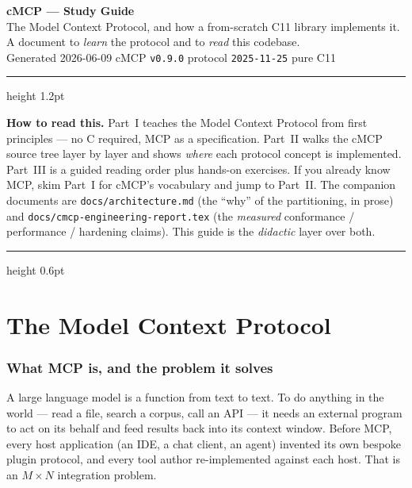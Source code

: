 \documentclass[10pt]{article}
\newcommand{\code}[1]{\texttt{\small #1}}
\begin{document}
\begin{center}
  {\LARGE\bfseries cMCP --- Study Guide}\\[4pt]
  {\normalsize The Model Context Protocol, and how a from-scratch C11 library implements it.\\
   A document to \emph{learn} the protocol and to \emph{read} this codebase.}\\[6pt]
  {\small\color{rulegrey} Generated 2026-06-09 \quad\textbullet\quad
   cMCP \code{v0.9.0} \quad\textbullet\quad protocol \code{2025-11-25} \quad\textbullet\quad pure C11}
\end{center}
\vspace{-2pt}
{\color{secblue}\hrule height 1.2pt}
\vspace{6pt}

{\small\textbf{How to read this.} Part~I teaches the Model Context Protocol from
first principles --- no C required, MCP as a specification. Part~II walks the
cMCP source tree layer by layer and shows \emph{where} each protocol concept is
implemented. Part~III is a guided reading order plus hands-on exercises. If you
already know MCP, skim Part~I for cMCP's vocabulary and jump to Part~II. The
companion documents are \code{docs/architecture.md} (the ``why'' of the
partitioning, in prose) and \code{docs/cmcp-engineering-report.tex} (the
\emph{measured} conformance / performance / hardening claims). This guide is the
\emph{didactic} layer over both.}

\tableofcontents
\vspace{4pt}
{\color{rulegrey}\hrule height 0.6pt}

\part{The Model Context Protocol}

\section{What MCP is, and the problem it solves}

A large language model is a function from text to text. To do anything in the
world --- read a file, search a corpus, call an API --- it needs an external
program to act on its behalf and feed results back into its context window. Before
MCP, every host application (an IDE, a chat client, an agent) invented its own
bespoke plugin protocol, and every tool author re-implemented against each host.
That is an $M\times N$ integration problem.
\end{document}
